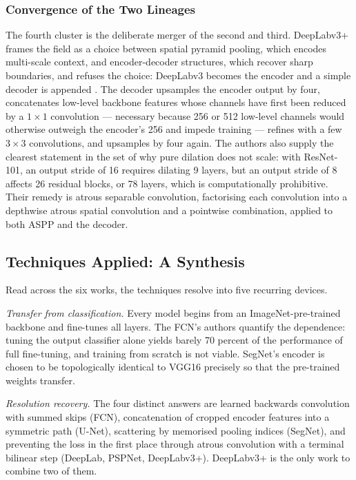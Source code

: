 \documentclass[journal]{IEEEtran}
\begin{document}
\subsubsection{Convergence of the Two Lineages}
The fourth cluster is the deliberate merger of the second and third. DeepLabv3+ frames
the field as a choice between spatial pyramid pooling, which encodes multi-scale
context, and encoder-decoder structures, which recover sharp boundaries, and refuses
the choice: DeepLabv3 becomes the encoder and a simple decoder is appended
\cite{chen2018encoderdecoder}. The decoder upsamples the encoder output by four,
concatenates low-level backbone features whose channels have first been reduced by a
$1\times1$ convolution --- necessary because 256 or 512 low-level channels would
otherwise outweigh the encoder's 256 and impede training --- refines with a few
$3\times3$ convolutions, and upsamples by four again. The authors also supply the
clearest statement in the set of why pure dilation does not scale: with ResNet-101, an
output stride of 16 requires dilating 9 layers, but an output stride of 8 affects 26
residual blocks, or 78 layers, which is computationally prohibitive. Their remedy is
atrous separable convolution, factorising each convolution into a depthwise atrous
spatial convolution and a pointwise combination, applied to both ASPP and the decoder.

\subsection{Techniques Applied: A Synthesis}

Read across the six works, the techniques resolve into five recurring devices.

\emph{Transfer from classification.} Every model begins from an ImageNet-pre-trained
backbone and fine-tunes all layers. The FCN's authors quantify the dependence: tuning
the output classifier alone yields barely 70 percent of the performance of full
fine-tuning, and training from scratch is not viable. SegNet's encoder is chosen to be
topologically identical to VGG16 precisely so that the pre-trained weights transfer.

\emph{Resolution recovery.} The four distinct answers are learned backwards
convolution with summed skips (FCN), concatenation of cropped encoder features into a
symmetric path (U-Net), scattering by memorised pooling indices (SegNet), and
preventing the loss in the first place through atrous convolution with a terminal
bilinear step (DeepLab, PSPNet, DeepLabv3+). DeepLabv3+ is the only work to combine
two of them.
\end{document}
